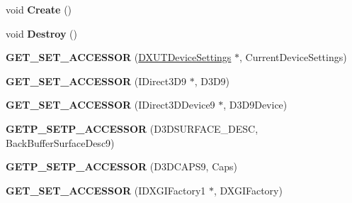 \begin{DoxyCompactItemize}
\item 
\hypertarget{class_d_x_u_t_state_a10a5fd4f5f0aacb6f0eee2fd52ae3329}{void {\bfseries Create} ()}\label{class_d_x_u_t_state_a10a5fd4f5f0aacb6f0eee2fd52ae3329}

\item 
\hypertarget{class_d_x_u_t_state_ac3f8f90b21b83e02512519a8423b9c7a}{void {\bfseries Destroy} ()}\label{class_d_x_u_t_state_ac3f8f90b21b83e02512519a8423b9c7a}

\item 
\hypertarget{class_d_x_u_t_state_ae718d3f29ce272c69ca2f1c4a5785c1d}{{\bfseries G\+E\+T\+\_\+\+S\+E\+T\+\_\+\+A\+C\+C\+E\+S\+S\+O\+R} (\hyperlink{struct_d_x_u_t_device_settings}{D\+X\+U\+T\+Device\+Settings} $\ast$, Current\+Device\+Settings)}\label{class_d_x_u_t_state_ae718d3f29ce272c69ca2f1c4a5785c1d}

\item 
\hypertarget{class_d_x_u_t_state_a32ec8b56480b125299a30a200975105e}{{\bfseries G\+E\+T\+\_\+\+S\+E\+T\+\_\+\+A\+C\+C\+E\+S\+S\+O\+R} (I\+Direct3\+D9 $\ast$, D3\+D9)}\label{class_d_x_u_t_state_a32ec8b56480b125299a30a200975105e}

\item 
\hypertarget{class_d_x_u_t_state_af0ca7011023a5b0bd3c01372a7ae2211}{{\bfseries G\+E\+T\+\_\+\+S\+E\+T\+\_\+\+A\+C\+C\+E\+S\+S\+O\+R} (I\+Direct3\+D\+Device9 $\ast$, D3\+D9\+Device)}\label{class_d_x_u_t_state_af0ca7011023a5b0bd3c01372a7ae2211}

\item 
\hypertarget{class_d_x_u_t_state_a347ac3b1c499ae41cbe7c22880ff6ae9}{{\bfseries G\+E\+T\+P\+\_\+\+S\+E\+T\+P\+\_\+\+A\+C\+C\+E\+S\+S\+O\+R} (D3\+D\+S\+U\+R\+F\+A\+C\+E\+\_\+\+D\+E\+S\+C, Back\+Buffer\+Surface\+Desc9)}\label{class_d_x_u_t_state_a347ac3b1c499ae41cbe7c22880ff6ae9}

\item 
\hypertarget{class_d_x_u_t_state_aa7a2337209f6a049279f2e906c51a582}{{\bfseries G\+E\+T\+P\+\_\+\+S\+E\+T\+P\+\_\+\+A\+C\+C\+E\+S\+S\+O\+R} (D3\+D\+C\+A\+P\+S9, Caps)}\label{class_d_x_u_t_state_aa7a2337209f6a049279f2e906c51a582}

\item 
\hypertarget{class_d_x_u_t_state_a61251b97cb6015fc5fb5f611d06672eb}{{\bfseries G\+E\+T\+\_\+\+S\+E\+T\+\_\+\+A\+C\+C\+E\+S\+S\+O\+R} (I\+D\+X\+G\+I\+Factory1 $\ast$, D\+X\+G\+I\+Factory)}\label{class_d_x_u_t_state_a61251b97cb6015fc5fb5f611d06672eb}


\end{DoxyCompactItemize}
